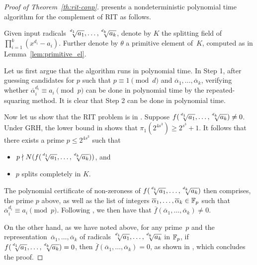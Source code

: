 \begin{proof}[Proof of Theorem~\ref{th:rit-conp}]
	 presents a nondeterministic polynomial time algorithm for the complement of  RIT  as follows.
	
	Given input radicals $\mysqrt{d_1}{a_1},\ldots,\mysqrt{d_k}{a_k}$,
	denote by $K$ the splitting field  of $\prod_{i=1}^k (x^{d_i}-a_i)$.
	 Further denote by $\theta$ a primitive element of~$K$, computed as in Lemma~\ref{lem:primitive_el}. 
	
	Let us first argue that the algorithm runs in polynomial time. 
In Step 1, after guessing candidates for $p$ such that $p \equiv 1 \pmod{d}$ and $\overline{\alpha}_1,\ldots,\overline{\alpha}_k$,  verifying whether $\overline{\alpha}_i^{d_i} \equiv a_i \pmod{p}$ can be done in polynomial time by the repeated-squaring method. It is clear that Step 2 can be done in polynomial time.
	
	Now let us show that the RIT problem is in \coNP. Suppose $f(\mysqrt{d_1}{a_1},\ldots,\mysqrt{d_k}{a_k}) \neq 0$. Under GRH, the lower bound in  shows that
	 $\pi_{1}(2^{4s^3}) \geq 2^{s^3} + 1$.
	 It follows that there exists a prime
	 $p\leq 2^{4s^3}$  such that 
	\begin{itemize}
		\item $p \nmid N(f(\mysqrt{d_1}{a_1},\ldots,\mysqrt{d_k}{a_k}))$, and
		\item $p$ splits completely in $K$.
	\end{itemize}
	
	The polynomial certificate of non-zeroness of $f(\mysqrt{d_1}{a_1},\ldots,\mysqrt{d_k}{a_k})$ then comprises, the prime $p$ above, as well as the list of integers $\overline{\alpha}_1,\ldots,\overline{\alpha}_k\in\mathbb{F}_p$ such that $\overline{\alpha}_i^{d_i}\equiv a_i \pmod{p}$. Following , we then have that $\overline{f}(\overline{\alpha}_1,\ldots,\overline{\alpha}_k) \neq 0$.
	   
	   On the other hand, as we have noted above, for any prime~$p$ and the representation~$\overline{\alpha}_1,\ldots,\overline{\alpha}_k$ of radicals $\mysqrt{d_1}{a_1},\ldots,\mysqrt{d_k}{a_k}$ in $\mathbb{F}_p$, if 
	   $f(\mysqrt{d_1}{a_1},\ldots,\mysqrt{d_k}{a_k}) = 0$, then $\overline{f}(\overline{\alpha}_1,\ldots,\overline{\alpha}_k) = 0$, as shown in , which concludes the proof.
\end{proof}

